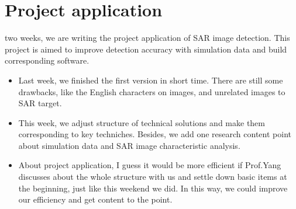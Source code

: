 \documentclass[]{IEEEtran}
\begin{document}
\section{Project application}
 two weeks, we are writing the project application of SAR image detection. This project is aimed to improve detection accuracy with simulation data and build corresponding software.
\begin{itemize}
	\item Last week, we finished the first version in short time. There are still some drawbacks, like the English characters on images, and unrelated images to SAR target.
	\item This week, we adjust structure of technical solutions and make them corresponding to key techniches. Besides, we add one research content point about simulation data and SAR image characteristic analysis.
	\item About project application, I guess it would be more efficient if Prof.Yang discusses about the whole structure with us and settle down basic items at the beginning, just like this weekend we did. In this way, we could improve our efficiency and get content to the point.
\end{itemize}




\newpage
\end{document}
